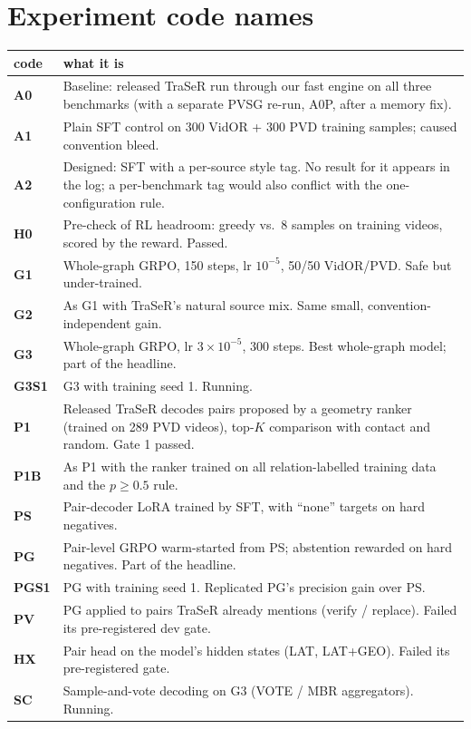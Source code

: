\documentclass[11pt,openany]{book}
\begin{document}
\chapter{Experiment code names}\label{app:codes}
\begin{center}
\small
\begin{tabular}{@{}>{\bfseries}l p{12.5cm}@{}}
\toprule
code & what it is \\
\midrule
A0 & Baseline: released TraSeR run through our fast engine on all three benchmarks (with a separate PVSG re-run, A0P, after a memory fix). \\
A1 & Plain SFT control on 300 VidOR + 300 PVD training samples; caused convention bleed. \\
A2 & Designed: SFT with a per-source style tag. No result for it appears in the log; a per-benchmark tag would also conflict with the one-configuration rule. \\
H0 & Pre-check of RL headroom: greedy vs.\ 8 samples on training videos, scored by the reward. Passed. \\
G1 & Whole-graph GRPO, 150 steps, lr $10^{-5}$, 50/50 VidOR/PVD. Safe but under-trained. \\
G2 & As G1 with TraSeR's natural source mix. Same small, convention-independent gain. \\
G3 & Whole-graph GRPO, lr $3\times10^{-5}$, 300 steps. Best whole-graph model; part of the headline. \\
G3S1 & G3 with training seed 1. Running. \\
P1 & Released TraSeR decodes pairs proposed by a geometry ranker (trained on 289 PVD videos), top-$K$ comparison with contact and random. Gate 1 passed. \\
P1B & As P1 with the ranker trained on all relation-labelled training data and the $p\ge0.5$ rule. \\
PS & Pair-decoder LoRA trained by SFT, with ``none'' targets on hard negatives. \\
PG & Pair-level GRPO warm-started from PS; abstention rewarded on hard negatives. Part of the headline. \\
PGS1 & PG with training seed 1. Replicated PG's precision gain over PS. \\
PV & PG applied to pairs TraSeR already mentions (verify / replace). Failed its pre-registered dev gate. \\
HX & Pair head on the model's hidden states (LAT, LAT+GEO). Failed its pre-registered gate. \\
SC & Sample-and-vote decoding on G3 (VOTE / MBR aggregators). Running. \\

\end{tabular}
\end{center}
\end{document}

